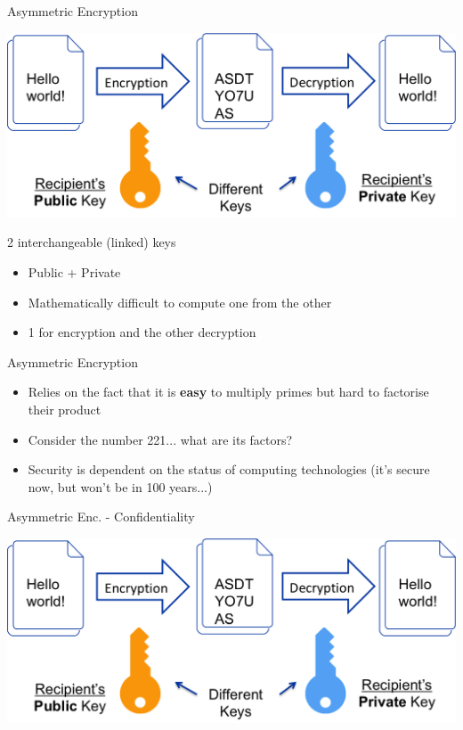 \documentclass{beamer}
\begin{document}
\begin{frame}{Asymmetric Encryption}
\begin{center}
	\includegraphics[width=0.45\linewidth]{asymmetric-encryption.png}
\end{center}
2 interchangeable (linked) keys
\begin{itemize}
  \item Public + Private 
  \item Mathematically difficult to compute one from the other 
  \item 1 for encryption and the other decryption
\end{itemize} 
\end{frame}

\begin{frame}{{\color{red}Asymmetric Encryption}}
\begin{itemize}
\item Relies on the fact that it is \textbf{easy} to multiply primes but hard to factorise their product
\item Consider the number 221... what are its factors?
\item Security is dependent on the status of computing technologies (it's secure now, but won't be in 100 years...)
\end{itemize}
\end{frame}

\begin{frame}{{\color{red}Asymmetric Enc. - Confidentiality}}
\begin{center}
\includegraphics[width=0.9\linewidth]{asymmetric-encryption.png}
\end{center}
\end{frame}
\end{document}
